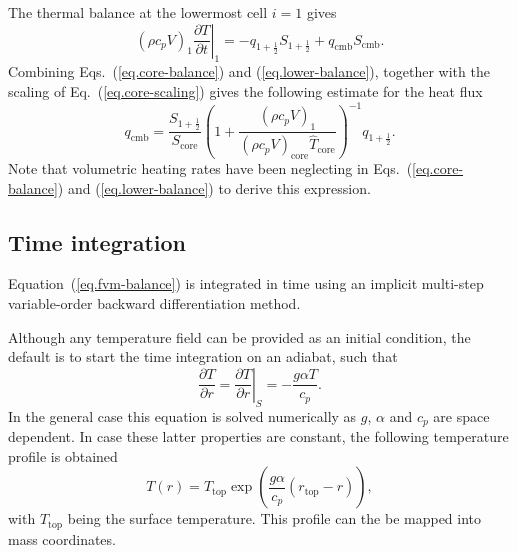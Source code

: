 \documentclass{article}
\begin{document}
The thermal balance at the lowermost cell $i=1$ gives
\begin{equation}
    (\rho c_p V)_1 \left.\frac{\partial T}{\partial t}\right|_1 = -q_{1+\frac{1}{2}} S_{1+\frac{1}{2}} + q_\mathrm{cmb} S_\mathrm{cmb}.
    \label{eq.lower-balance}
\end{equation}
Combining Eqs.~(\ref{eq.core-balance}) and (\ref{eq.lower-balance}), together with the scaling of Eq.~(\ref{eq.core-scaling}) gives the following estimate for the heat flux
\begin{equation}
q_\mathrm{cmb}=\frac{S_{1+\frac{1}{2}}}{S_\mathrm{core}}\left(1+\frac{(\rho c_p V)_1}{(\rho c_p V)_\mathrm{core}\hat{T}_\mathrm{core}}\right)^{-1} q_{1+\frac{1}{2}}.
\end{equation}
Note that volumetric heating rates have been neglecting in Eqs.~(\ref{eq.core-balance}) and (\ref{eq.lower-balance}) to derive this expression.

\subsection{Time integration}

Equation~(\ref{eq.fvm-balance}) is integrated in time using an implicit multi-step variable-order backward differentiation method.

Although any temperature field can be provided as an initial condition, the default is to start the time integration on an adiabat, such that
\begin{equation}
    \frac{\partial T}{\partial r} =
    \left.\frac{\partial T}{\partial r}\right|_S = -\frac{g\alpha T}{c_p}.
\end{equation}
In the general case this equation is solved numerically as $g$, $\alpha$ and $c_p$ are space dependent. In case these latter properties are constant, the following temperature profile is obtained
\begin{equation}
    T(r) = T_\mathrm{top} \exp\left(\frac{g\alpha}{c_p}(r_\mathrm{top}-r)\right),
\end{equation}
with $T_\mathrm{top}$ being the surface temperature. This profile can the be mapped into mass coordinates.
\end{document}
